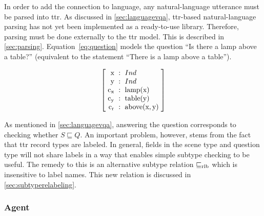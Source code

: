 %

In order to add the  connection to language, any natural-language utterance must be parsed into \gls{ttr}.
As discussed in \autoref{sec:languagevqa}, \gls{ttr}-based natural-language parsing has not yet been implemented as a ready-to-use library.
Therefore, parsing must be done externally to the \gls{ttr} model.
This is described in \autoref{sec:parsing}.
Equation~\ref{eq:question} models the question ``Is there a lamp above a table?'' (equivalent to the statement ``There is a lamp above a table'').

\begin{equation}\label{eq:question}
\rec{
    \text{x} &:& Ind \\
    \text{y} &:& Ind \\
    \text{c}_\text{x} &:& \text{lamp}(\text{x}) \\
    \text{c}_\text{y} &:& \text{table}(\text{y}) \\
    \text{c}_\text{r} &:& \text{above}(\text{x}, \text{y}) \\
    }
\end{equation}

As mentioned in \autoref{sec:languagevqa}, answering the question corresponds to checking whether $S \sqsubseteq Q$.
An important problem, however, stems from the fact that \gls{ttr} record types are labeled.
In general, fields in the scene type and question type will not share labels in a way that enables simple subtype checking to be useful.
The remedy to this is an alternative subtype relation $\mathrel{\sqsubseteq_\text{rlb}}$ which is insensitive to label names.
This new relation is discussed in \autoref{sec:subtyperelabeling}.



\subsubsection{Agent}
\label{sec:agent}

